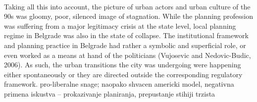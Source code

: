 \documentclass[11pt]{report}
\begin{document}
\\
Taking all this into account, the picture of urban actors and urban culture of the 90s was gloomy, poor, silenced image of stagnation. While the planning profession was suffering from a major legitimacy crisis at the state level, local planning regime in Belgrade was also in the state of collapse. The institutional framework and planning practice in Belgrade had rather a symbolic and superficial role, or even worked as a means at hand of the politicians (Vujosevic and Nedovic-Budic, 2006). As such, the urban transitions the city was undergoing were happening either spontaneously or they are directed outside the corresponding regulatory framework.
pro-liberalne snage; naopako shvacen americki model, negativna primena iskustva – prokazivanje planiranja, prepustanje stihiji trzista
\end{document}
